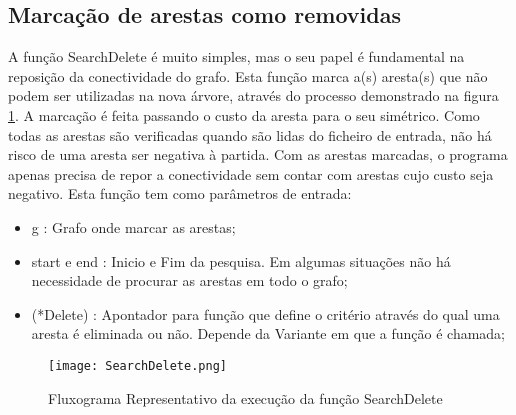\documentclass[14pt]{article}
\begin{document}
    \subsection[SearchDelete]{Marcação de arestas como removidas}\label{subsec:SearchDelete}
    A função SearchDelete é muito simples, mas o seu papel é fundamental na reposição da conectividade do grafo.
    Esta função marca a(s) aresta(s) que não podem ser utilizadas na nova árvore, através do processo demonstrado na figura \ref{fig:SearchDelete}.
    A marcação é feita passando o custo da aresta para o seu simétrico.
    Como todas as arestas são verificadas quando são lidas do ficheiro de entrada, não há risco de uma aresta ser negativa à partida.
    Com as arestas marcadas, o programa apenas precisa de repor a conectividade sem contar com arestas cujo custo seja negativo.
    Esta função tem como parâmetros de entrada:
    \begin{itemize}
        \item g : Grafo onde marcar as arestas;
        \item start e end : Inicio e Fim da pesquisa. Em algumas situações não há necessidade de procurar as arestas em todo o grafo;
        \item (*Delete) : Apontador para função que define o critério através do qual uma aresta é eliminada ou não. Depende da Variante em que a função é chamada;
    \end{itemize}
    \begin{figure}[H]
        \centering
        \label{fig:SearchDelete}
        \texttt{[image: SearchDelete.png]}
        \caption { Fluxograma Representativo da execução da função SearchDelete }
    \end{figure}
\end{document}

